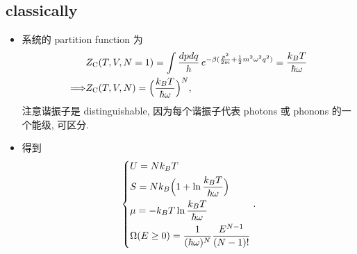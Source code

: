 \subsection{classically}
\begin{itemize}
	\item 系统的 partition function 为
	\begin{align}
		& Z_\text{C}(T, V, N = 1) = \int \frac{dp dq}{h} \, e^{- \beta (\frac{p^2}{2 m} + \frac{1}{2} m^2 \omega^2 q^2)} = \frac{k_B T}{\hbar \omega} \notag \\
		\Longrightarrow & Z_\text{C}(T, V, N) = \Big( \frac{k_B T}{\hbar \omega} \Big)^N,
	\end{align}
	注意谐振子是 distinguishable, 因为每个谐振子代表 photons 或 phonons 的一个能级, 可区分.
	
	\item 得到
	\begin{equation}
		\begin{dcases}
			U = N k_B T \\
			S = N k_B \Big( 1 + \ln \frac{k_B T}{\hbar \omega} \Big) \\
			\mu = - k_B T \ln \frac{k_B T}{\hbar \omega} \\
			\Omega(E \geq 0) = \frac{1}{(\hbar \omega)^N} \frac{E^{N - 1}}{(N - 1)!}
		\end{dcases}.
	\end{equation}
\end{itemize}

